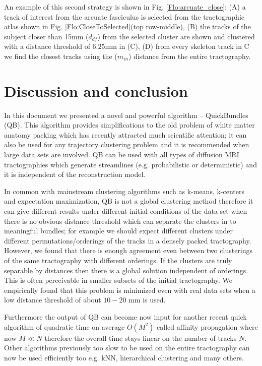 \documentclass[preprint,authoryear,a4paper,10pt,onecolumn]{elsarticle}
\begin{document}
An example of this second strategy is shown in
Fig. \ref{Flo:arcuate_close}: (A) a track of interest from the arcuate
fasciculus is selected from the tractographic atlas shown in
Fig. \ref{Flo:CloseToSelected}(top row-middle), (B) the tracks of the
subject closer than 15mm ($d_{df}$) from the selected cluster are shown
and clustered with a distance threshold of $6.25$mm in (C), (D) from
every skeleton track in C we find the closest tracks using the
($m_{in}$) distance from the entire tractography.


\section{Discussion and conclusion}

In this document we presented a novel and powerful algorithm --
QuickBundles (QB). This algorithm provides simplifications to the old
problem of white matter anatomy packing which has recently attracted
much scientific attention; it can also be used for any trajectory
clustering problem and it is recommended when large data sets are
involved. QB can be used with all types of diffusion MRI tractographies
which generate streamlines (e.g. probabilistic or deterministic) and it
is independent of the reconstruction model.

In common with mainstream clustering algorithms such as k-means,
k-centers and expectation maximization, QB is not a global clustering
method therefore it can give different results under different initial
conditions of the data set when there is no obvious distance threshold
which can separate the clusters in to meaningful bundles; for example we
should expect different clusters under different permutations/orderings
of the tracks in a densely packed tractography. However, we found that
there is enough agreement even between two clusterings of the same
tractography with different orderings. If the clusters are truly
separable by distances then there is a global solution independent of
orderings. This is often perceivable in smaller subsets of the initial
tractography. We empirically found that this problem is minimized even
with real data sets when a low distance threshold of about $10-20$ mm is
used.

Furthermore the output of QB can become now input for another recent
quick algorithm of quadratic time on average $O(M^{2})$ called affinity
propagation where now $M\ll N$ therefore the overall time stays linear
on the number of tracks $N$. Other algorithms previously too slow to be
used on the entire tractography can now be used efficiently too
e.g. kNN, hierarchical clustering and many others.
\end{document}

